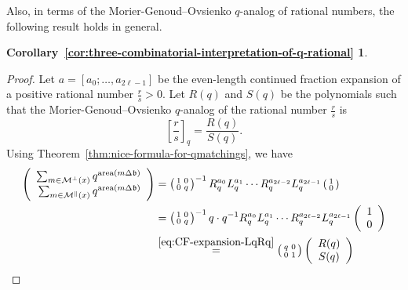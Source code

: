 \documentclass[a4paper,12pt]{amsart}
\newtheorem*{COROLLARYE}{Corollary~\ref{cor:three-combinatorial-interpretation-of-q-rational}}
\newcommand{\xx}{{x}}
\newcommand{\Mcal}{{\mathcal{M}}}
\newcommand{\bfrak}{{\mathfrak{b}}}
\newcommand{\0}{\mathtt{0}}
\newcommand{\1}{\mathtt{1}}
\newcommand{\2}{\mathtt{2}}
\newcommand{\3}{\mathtt{3}}
\newcommand{\carreplein}{{\perp}}
\newcommand{\carrevide}{{\parallel}}
\DeclareMathOperator{\area}{area}
\begin{document}
Also, in terms of the Morier-Genoud--Ovsienko $q$-analog of rational numbers,
the following result holds in general.



\begin{COROLLARYE}
    \MainCorollaryE
\end{COROLLARYE}

\begin{proof}
    Let $a=[a_0;\dots,a_{2\ell-1}]$ be the even-length continued fraction expansion
    of a positive rational number $\frac{r}{s}>0$.
    Let $R(q)$ and $S(q)$ be the polynomials such that
    the Morier-Genoud--Ovsienko $q$-analog of the rational number $\frac{r}{s}$ is
    \[
        \left[\frac{r}{s}\right]_q
        =
        \frac{R(q)}{S(q)}.
    \]
    Using Theorem~\ref{thm:nice-formula-for-qmatchings}, we have
    \begin{align*}
        \left(\begin{array}{r}
            \sum_{m\in \Mcal^\carreplein(\xx)} q^{\area(m\Delta\bfrak)}\\
              \sum_{m\in \Mcal^\carrevide (\xx)} q^{\area(m\Delta\bfrak)}
        \end{array}\right)
            &=
        \left(\begin{smallmatrix} 1 & 0 \\ 0 & q \end{smallmatrix}\right)^{-1}
        R_q^{a_0}L_q^{a_1}\cdots R_q^{a_{2\ell-2}}L_q^{a_{2\ell-1}}
        \left(\begin{smallmatrix} 1 \\ 0 \end{smallmatrix}\right)\\
        &=
        \left(\begin{smallmatrix} 1 & 0 \\ 0 & q \end{smallmatrix}\right)^{-1}
        q\cdot q^{-1} R_q^{a_0}L_q^{a_1}\cdots R_q^{a_{2\ell-2}}L_q^{a_{2\ell-1}}
            \left(\begin{array}{c} 1 \\ 0 \end{array}\right)\\
        &\overset{\eqref{eq:CF-expansion-LqRq}}{=}
        \left(\begin{smallmatrix} q & 0 \\ 0 & 1 \end{smallmatrix}\right)
        \left(\begin{array}{c} R(q) \\ S(q) \end{array}\right)

\end{align*}
\end{proof}
\end{document}
